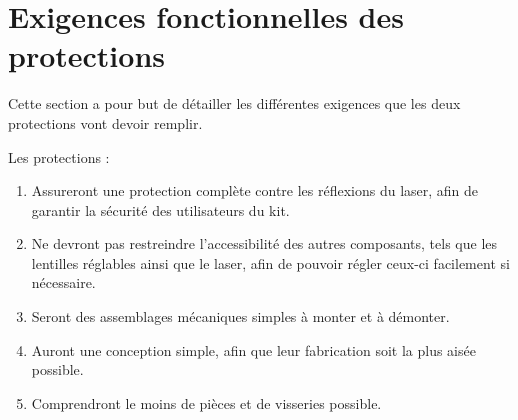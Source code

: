 \section{Exigences fonctionnelles des protections}
Cette section a pour but de détailler les différentes exigences que les deux protections vont devoir remplir.

Les protections :
\begin{enumerate}
    \item Assureront une protection complète contre les réflexions du laser, afin de garantir la sécurité des utilisateurs du kit.
    \item Ne devront pas restreindre l'accessibilité des autres composants, tels que les lentilles réglables ainsi que le laser, afin de pouvoir régler ceux-ci facilement si nécessaire.
    \item Seront des assemblages mécaniques simples à monter et à démonter.
    \item Auront une conception simple, afin que leur fabrication soit la plus aisée possible.
    \item Comprendront le moins de pièces et de visseries possible.
\end{enumerate}


